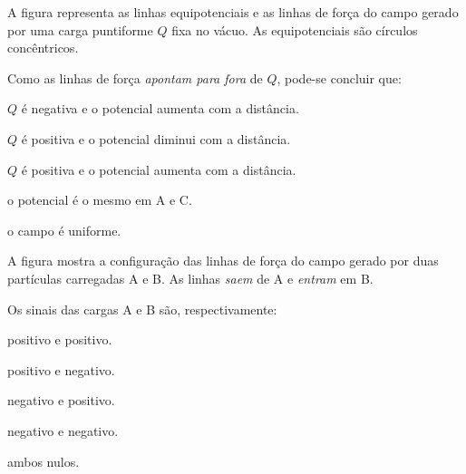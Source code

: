 \begin{questao}[2]{}

A figura representa as linhas equipotenciais e as linhas de força do campo gerado
por uma carga puntiforme $Q$ fixa no vácuo. As equipotenciais são círculos
concêntricos.


Como as linhas de força \emph{apontam para fora} de $Q$, pode-se concluir que:
\begin{alternativas}
\item $Q$ é negativa e o potencial aumenta com a distância.
\item $Q$ é positiva e o potencial diminui com a distância.
\item $Q$ é positiva e o potencial aumenta com a distância.
\item o potencial é o mesmo em A e C.
\item o campo é uniforme.
\end{alternativas}


\end{questao}
\begin{questao}[2]{}

A figura mostra a configuração das linhas de força do campo gerado por duas
partículas carregadas A e B. As linhas \emph{saem} de A e \emph{entram} em B.


Os sinais das cargas A e B são, respectivamente:
\begin{alternativas}[2]
\item positivo e positivo.
\item positivo e negativo.
\item negativo e positivo.
\item negativo e negativo.
\item ambos nulos.
\end{alternativas}


\end{questao}
